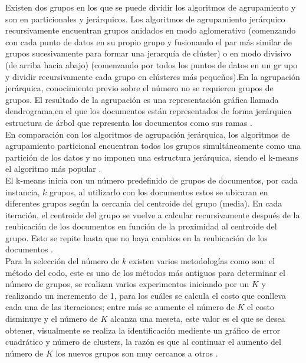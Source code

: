 {Existen dos grupos en los que se puede dividir los algoritmos de agrupamiento y son en particionales y jerárquicos. Los algoritmos de agrupamiento jerárquico recursivamente encuentran grupos anidados en modo aglomerativo (comenzando con cada punto de datos en su propio grupo y fusionando el par más similar de grupos sucesivamente para formar una jerarquía de clúster) o en modo divisivo (de arriba hacia abajo) (comenzando por todos los puntos de datos en un gr upo y dividir recursivamente cada grupo en clústeres más pequeños).En la agrupación jerárquica, conocimiento previo sobre el número no se requieren grupos de grupos. El resultado de la agrupación es una representación gráfica llamada dendrograma,en el que los documentos están representados de forma jerárquica estructura de árbol que representa los documentos como sus ramas \cite{Renganathan2017,Jain2010}.\\

En comparación con los algoritmos de agrupación jerárquica, los algoritmos de agrupamiento  particional encuentran todos los grupos simultáneamente como una partición de los datos y no imponen una estructura jerárquica, siendo el k-means el algoritmo más popular \cite{Jain2010}. \\

El k-means inicia con un número predefinido de grupos de documentos, por cada instancia, $k$ grupos, al utilizarlo con los documentos estos se ubicaran en diferentes grupos según  la cercania del centroide del grupo (media). En cada iteración, el centroide del grupo se vuelve a calcular recursivamente después de la reubicación de los documentos en función de la proximidad al centroide del grupo. Esto se repite hasta que no haya cambios en la reubicación de los documentos \cite{Renganathan2017}. \\

Para la selección del número de $k$ existen varios metodologías como son: el método del codo, este es uno de los métodos más antiguos para determinar el número de grupos, se realizan varios experimentos iniciando por un $K$  y realizando un incremento de 1, para los cuáles se calcula el costo que conlleva cada una de las iteraciones; entre más se aumente el número de $K$ el costo disminuye y el número de $K$ alcanza una meseta, este valor es el que se desea obtener, visualmente se realiza la identificación mediente un gráfico de error cuadrático y número de clusters, la razón es que al continuar el aumento del número de $K$ los nuevos grupos son muy cercanos a otros \cite{Kodinariya2013}.\\ 

}
